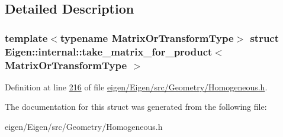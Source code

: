 \subsection{Detailed Description}
\subsubsection*{template$<$typename Matrix\+Or\+Transform\+Type$>$\newline
struct Eigen\+::internal\+::take\+\_\+matrix\+\_\+for\+\_\+product$<$ Matrix\+Or\+Transform\+Type $>$}



Definition at line \hyperlink{eigen_2_eigen_2src_2_geometry_2_homogeneous_8h_source_l00216}{216} of file \hyperlink{eigen_2_eigen_2src_2_geometry_2_homogeneous_8h_source}{eigen/\+Eigen/src/\+Geometry/\+Homogeneous.\+h}.



The documentation for this struct was generated from the following file\+:\begin{DoxyCompactItemize}
\item 
eigen/\+Eigen/src/\+Geometry/\+Homogeneous.\+h\end{DoxyCompactItemize}

